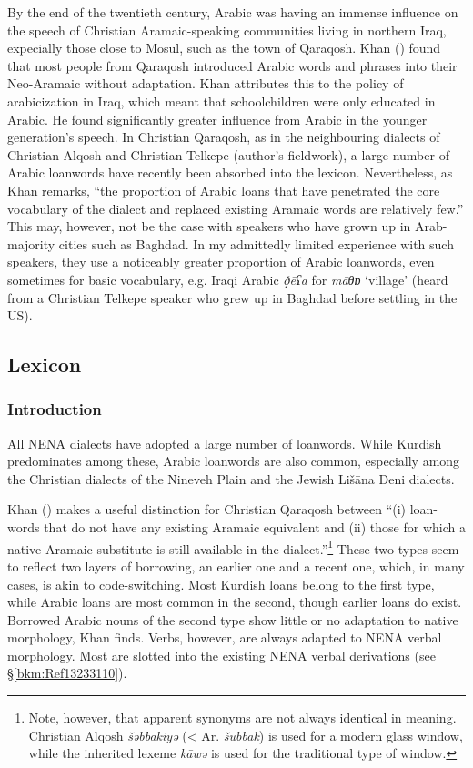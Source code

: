 \documentclass[output=paper]{langsci/langscibook}
\begin{document}
By the end of the twentieth century, Arabic was having an immense influence on the speech of Christian Aramaic-speaking communities living in northern Iraq, expecially those close to Mosul, such as the town of Qaraqosh. Khan (\citeyear[9]{Khan2002}) found that most people from Qaraqosh introduced Arabic words and phrases into their Neo-Aramaic without adaptation.  Khan attributes this to the policy of arabicization in Iraq, which meant that schoolchildren were only educated in Arabic. He found significantly greater influence from Arabic in the younger generation’s speech. In Christian Qaraqosh, as in the neighbouring dialects of Christian Alqosh and Christian Telkepe (author’s fieldwork), a large number of Arabic loanwords have recently been absorbed into the lexicon. Nevertheless, as Khan remarks, “the proportion of Arabic loans that have penetrated the core vocabulary of the dialect and replaced existing Aramaic words are relatively few.” This may, however, not be the case with speakers who have grown up in Arab-majority cities such as Baghdad. In my admittedly limited experience with such speakers, they use a noticeably greater proportion of Arabic loanwords, even sometimes for basic vocabulary, e.g. Iraqi Arabic \textit{ð̣ēʕa} for \textit{māθɒ} ‘village’ (heard from a Christian Telkepe speaker who grew up in Baghdad before settling in the US).

\subsection{Lexicon}
\subsubsection{\label{bkm:Ref13232790}Introduction}

All NENA dialects have adopted a large number of loanwords. While Kurdish predominates among these, Arabic loanwords are also common, especially among the Christian dialects of the Nineveh Plain and the Jewish Lišāna Deni dialects.

 Khan (\citeyear[516]{Khan2002}) makes a useful distinction for Christian Qaraqosh between “(i) loan-words that do not have any existing Aramaic equivalent and (ii) those for which a native Aramaic substitute is still available in the dialect.”\footnote{Note, however, that apparent synonyms are not always identical in meaning. Christian Alqosh \textit{šəbbakiyə} (< Ar. \textit{šubbāk}) is used for a modern glass window, while the inherited lexeme \textit{kāwə} is used for the traditional type of window.} These two types seem to reflect two layers of borrowing, an earlier one and a recent one, which, in many cases, is akin to code-switching. Most Kurdish loans belong to the first type, while Arabic loans are most common in the second, though earlier loans do exist. Borrowed Arabic nouns of the second type show little or no adaptation to native morphology, Khan finds. Verbs, however, are always adapted to NENA verbal morphology. Most are slotted into the existing NENA verbal derivations (see §\ref{bkm:Ref13233110}).
\end{document}
